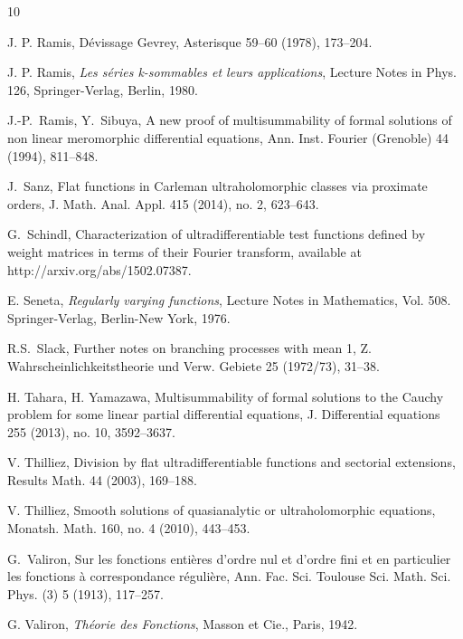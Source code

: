 \documentclass[11pt,a4paper]{article}
\theoremstyle{definition}
\begin{document}
\begin{thebibliography}{10}


 J. P. Ramis,
D\'evissage Gevrey, Asterisque 59--60 (1978), 173--204.

 J. P. Ramis, \emph{Les s\'eries k-sommables et leurs applications}, Lecture Notes in
Phys. 126, Springer-Verlag, Berlin, 1980.

 J.-P.~Ramis, Y.~Sibuya,
A new proof of multisummability of
formal solutions of non linear meromorphic
differential equations, Ann. Inst. Fourier (Grenoble) 44 (1994), 811--848.





 J.~Sanz, Flat functions in Carleman ultraholomorphic classes
via proximate orders, J. Math. Anal. Appl. 415 (2014), no. 2, 623--643.

 G.~Schindl, Characterization of ultradifferentiable test
functions defined by weight matrices in terms of their Fourier transform, available at  http://arxiv.org/abs/1502.07387.



 E. Seneta, \emph{Regularly varying functions}, Lecture Notes in Mathematics,
Vol. 508. Springer-Verlag, Berlin-New York, 1976.

 R.S.~Slack, Further notes on branching processes with mean 1,
Z. Wahrscheinlichkeitstheorie und Verw. Gebiete 25 (1972/73), 31--38.

 H. Tahara, H. Yamazawa, Multisummability of formal solutions to the
Cauchy problem for some linear partial differential equations, J. Differential equations 255 (2013), no. 10, 3592--3637.

 V. Thilliez, Division by flat ultradifferentiable functions and
sectorial extensions, Results Math. 44 (2003), 169--188.

 V. Thilliez, Smooth solutions of quasianalytic
or ultraholomorphic equations, Monatsh. Math. 160, no. 4 (2010), 443--453.


 G.~Valiron, Sur les fonctions enti\`eres d'ordre nul et d'ordre fini et en particulier les fonctions \`a correspondance r\'eguli\`ere, Ann. Fac. Sci. Toulouse Sci. Math. Sci. Phys. (3) 5 (1913), 117--257.

 G. Valiron, \emph{Th\'eorie des Fonctions}, Masson et Cie., Paris, 1942.
\end{thebibliography}
\end{document}
